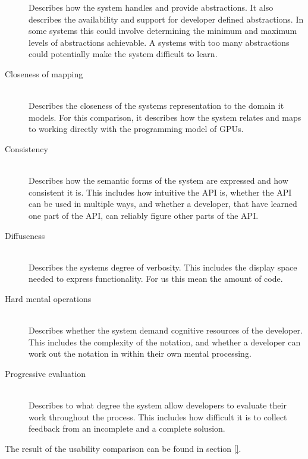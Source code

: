 \begin{description}
    Describes how the system handles and provide abstractions. It also describes the availability and support for developer defined abstractions. In some systems this could involve determining the minimum and maximum levels of abstractions achievable. A systems with too many abstractions could potentially make the system difficult to learn.
    \item[Closeness of mapping]\hfill\\
    Describes the closeness of the systems representation to the domain it models. For this comparison, it describes how the system relates and maps to working directly with the programming model of GPUs.  
    \item[Consistency]\hfill\\
    Describes how the semantic forms of the system are expressed and how consistent it is. This includes how intuitive the API is, whether the API can be used in multiple ways, and whether a developer, that have learned one part of the API, can reliably figure other parts of the API. 
    \item[Diffuseness]\hfill\\
    Describes the systems degree of verbosity. This includes the display space needed to express functionality. For us this mean the amount of code.
    \item[Hard mental operations]\hfill\\
    Describes whether the system demand cognitive resources of the developer. This includes the complexity of the notation, and whether a developer can work out the notation in within their own mental processing.
    \item[Progressive evaluation]\hfill\\ %
    Describes to what degree the system allow developers to evaluate their work throughout the process. This includes how difficult it is to collect feedback from an incomplete and a complete solusion.
\end{description}

The result of the usability comparison can be found in section \ref{}.